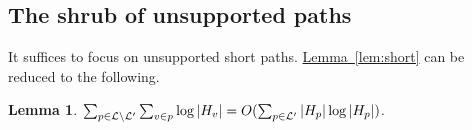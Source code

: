 \documentclass[11pt]{article}
\newtheorem{lemma}[theorem]{Lemma}
\newtheorem{corollary}[theorem]{Corollary}
\theoremstyle{definition}
\newcommand{\cL}{{\cal L}}
\newcommand{\Lem}[1]{\hyperref[lem:#1]{Lemma~\ref*{lem:#1}}} %
\newcommand{\XSays}[2]{{
      {$\rule[-0.12cm]{0.2in}{0.5cm}$\fbox{\tt
            #1:} }
      \textcolor{red}{#2}
      \marginpar{\textcolor{blue}{#1}}
      {$\rule[0.1cm]{0.3in}{0.1cm}$\fbox{\tt
            end}$\rule[0.1cm]{0.3in}{0.1cm}$}
      }
   }
\newcommand{\Ben}[1]{{\XSays{Ben}{#1}}}
\begin{document}
{{%
% 
% 
% 
% 
%  

}



\subsection{The shrub of unsupported paths} \label{sec:short}



It suffices to focus on unsupported short paths. \Lem{short} can be reduced to the following.

\begin{lemma} \label{lem:support} $\sum_{p \in \cL \setminus \cL'} \sum_{v \in p} \log |H_v| = O(\sum_{p \in \cL'} |H_p| \log |H_p|)$.
\end{lemma}

}
\end{document}
